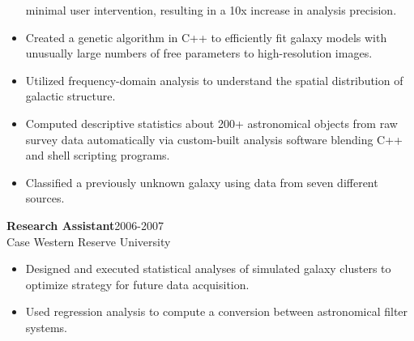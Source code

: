 \documentclass[11pt]{res}
\begin{document}
\begin{resume}
\begin{itemize}
                     minimal user intervention, resulting in a 10x increase in analysis precision.
                   \item Created a genetic
                     algorithm in C++ to efficiently fit galaxy models with
                     unusually large numbers of
                     free parameters to high-resolution images.
                   \item Utilized frequency-domain analysis to
                     understand the spatial distribution of galactic structure.
                  \item Computed descriptive statistics about
                    200+ astronomical objects from raw survey data
                    automatically via custom-built analysis software
                    blending C++ and shell scripting programs.
                  \item  Classified a previously unknown
                    galaxy using data from seven different sources. 
                  \end{itemize} 
\vspace {-0.15 in}
{\bf Research Assistant}\hfill\mbox{2006-2007}\\
Case Western Reserve University
                  \vspace* {0.01 in}\begin{itemize} \itemsep -2pt
                    \item Designed and executed statistical analyses
                      of simulated galaxy clusters to optimize
                      strategy for future data acquisition.
                    \item Used 
                      regression analysis to compute a conversion
                      between astronomical filter systems. 
                  \end{itemize} 

\end{resume}
\end{document}
